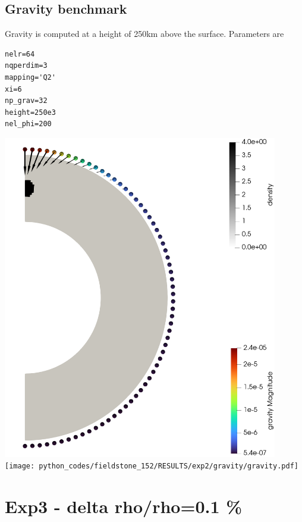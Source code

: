 \newpage
\subsection*{Gravity benchmark}

Gravity is computed at a height of 250km above the surface. 
Parameters are 
\begin{lstlisting}
nelr=64
nqperdim=3
mapping='Q2'
xi=6
np_grav=32
height=250e3
nel_phi=200
\end{lstlisting}

\begin{center}
\includegraphics[width=12cm]{python_codes/fieldstone_152/RESULTS/exp2/gravity/gravity.png}\\
\texttt{[image: python\_codes/fieldstone\_152/RESULTS/exp2/gravity/gravity.pdf]}
\end{center}







\newpage
\section{Exp3 - delta rho/rho=0.1 \%}

